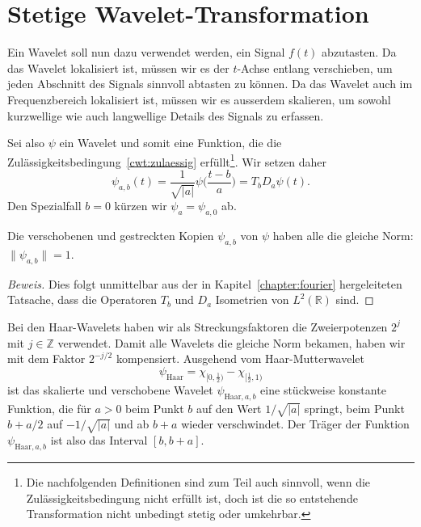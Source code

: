 %
%
%
\section{Stetige Wavelet-Transformation
\label{sextion:cwt}}
Ein Wavelet soll nun dazu verwendet werden, ein Signal $f(t)$ abzutasten.
Da das Wavelet lokalisiert ist, müssen wir es der $t$-Achse entlang
verschieben, um jeden Abschnitt des Signals sinnvoll abtasten zu
können.
Da das Wavelet auch im Frequenzbereich lokalisiert ist, müssen wir
es ausserdem skalieren, um sowohl kurzwellige wie auch langwellige
Details des Signals zu erfassen.

Sei also $\psi$ ein Wavelet und somit eine Funktion, die die
Zulässigkeitsbedingung~\eqref{cwt:zulaessig} erfüllt\footnote{Die nachfolgenden
Definitionen sind zum Teil auch sinnvoll, wenn die Zulässigkeitsbedingung
nicht erfüllt ist, doch ist die so entstehende Transformation nicht unbedingt
stetig oder umkehrbar.}.
Wir setzen daher
\[
\psi_{a,b}(t)
=
\frac{1}{\sqrt{|a|}} \psi\biggl(\frac{t-b}a\biggr)
=
T_bD_a\psi (t).
\]
Den Spezialfall $b=0$ kürzen wir $\psi_a = \psi_{a,0}$ ab.

\begin{lemma}
Die verschobenen und gestreckten Kopien $\psi_{a,b}$ von $\psi$ haben alle
die gleiche Norm: $\|\psi_{a,b}\|=1$.
\end{lemma}

\begin{proof}[Beweis]
Dies folgt unmittelbar aus der in Kapitel~\ref{chapter:fourier}
hergeleiteten Tatsache, dass die Operatoren $T_b$ und $D_a$
Isometrien von $L^2(\mathbb R)$ sind.
\end{proof}

\begin{beispiel}
Bei den Haar-Wavelets haben wir als Streckungsfaktoren die Zweierpotenzen
$2^j$ mit $j\in\mathbb Z$ verwendet.
Damit alle Wavelets die gleiche Norm bekamen, haben wir mit dem Faktor
$2^{-j/2}$ kompensiert.
Ausgehend vom Haar-Mutterwavelet
\[
\psi_{\text{Haar}} = \chi_{[0,\frac12)} - \chi_{[\frac12,1)}
\]
ist das skalierte und verschobene Wavelet
$\psi_{\text{Haar},a,b}$ eine stückweise konstante Funktion,
die für $a>0$ beim Punkt $b$ auf den Wert $1/\sqrt{|a|}$ springt,
beim Punkt $b+a/2$ auf $-1/\sqrt{|a|}$ und ab $b+a$ wieder verschwindet.
Der Träger der Funktion $\psi_{\text{Haar},a,b}$ ist also das Interval
$[b,b+a]$.
\end{beispiel}

